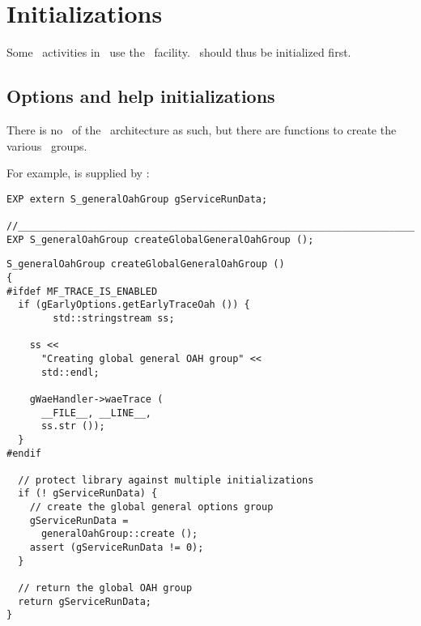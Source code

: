 



\chapter{Initializations}

Some \initialization\ activities in \mf\ use the \oahRepr\ facility. \oahRepr\ should thus be initialized first.


\section{Options and help initializations}

There is no \initialization\  of the \oahRepr\ architecture as such, but there are  functions to create the various \oahRepr\ groups.

For example,  is supplied by : %
\begin{lstlisting}[language=CPlusPlus]
EXP extern S_generalOahGroup gServiceRunData;

//______________________________________________________________________________
EXP S_generalOahGroup createGlobalGeneralOahGroup ();
\end{lstlisting}

\begin{lstlisting}[language=CPlusPlus]
S_generalOahGroup createGlobalGeneralOahGroup ()
{
#ifdef MF_TRACE_IS_ENABLED
  if (gEarlyOptions.getEarlyTraceOah ()) {
		std::stringstream ss;

    ss <<
      "Creating global general OAH group" <<
      std::endl;

    gWaeHandler->waeTrace (
      __FILE__, __LINE__,
      ss.str ());
  }
#endif

  // protect library against multiple initializations
  if (! gServiceRunData) {
    // create the global general options group
    gServiceRunData =
      generalOahGroup::create ();
    assert (gServiceRunData != 0);
  }

  // return the global OAH group
  return gServiceRunData;
}
\end{lstlisting}


